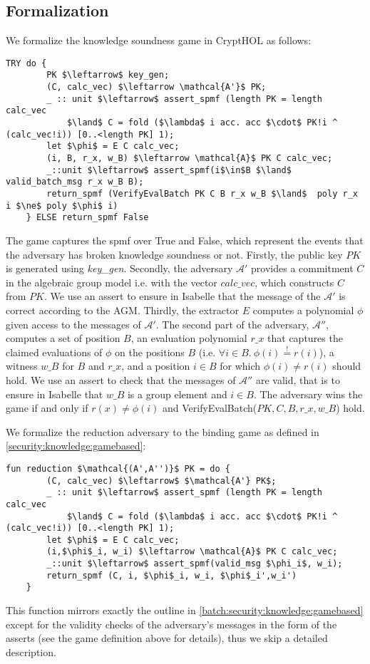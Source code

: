 \subsection{Formalization}
We formalize the knowledge soundness game in CryptHOL as follows: 
\begin{lstlisting}[language=isabelle]
    TRY do {
        PK $\leftarrow$ key_gen;
        (C, calc_vec) $\leftarrow \mathcal{A'}$ PK;
        _ :: unit $\leftarrow$ assert_spmf (length PK = length calc_vec 
            $\land$ C = fold ($\lambda$ i acc. acc $\cdot$ PK!i ^ (calc_vec!i)) [0..<length PK] 1);
        let $\phi$ = E C calc_vec;
        (i, B, r_x, w_B) $\leftarrow \mathcal{A}$ PK C calc_vec;
        _::unit $\leftarrow$ assert_spmf(i$\in$B $\land$ valid_batch_msg r_x w_B B);
        return_spmf (VerifyEvalBatch PK C B r_x w_B $\land$  poly r_x i $\ne$ poly $\phi$ i)
    } ELSE return_spmf False
\end{lstlisting}
The game captures the spmf over True and False, which represent the events that the adversary has broken knowledge soundness or not.
Firstly, the public key $PK$ is generated using \textit{key\_gen}. 
Secondly, the adversary $\mathcal{A'}$ provides a commitment $C$ in the algebraic group model i.e. with the vector $calc\_vec$, which constructs $C$ from $PK$. We use an assert to ensure in Isabelle that the message of the $\mathcal{A'}$ is correct according to the AGM.
Thirdly, the extractor $E$ computes a polynomial $\phi$ given access to the messages of $\mathcal{A'}$. 
The second part of the adversary, $\mathcal{A''}$, computes a set of position $B$, an evaluation polynomial $r\_x$ that captures the claimed evaluations of $\phi$ on the positions $B$ (i.e. $\forall i\in B.\ \phi(i)\stackrel{!}{=}r(i)$), a witness $w\_B$ for $B$ and $r\_x$, and a position $i\in B$ for which $\phi(i)\ne r(i)$ should hold. We use an assert to check that the messages of $\mathcal{A''}$ are valid, that is to ensure in Isabelle that $w\_B$ is a group element and $i\in B$.
The adversary wins the game if and only if $r(x) \ne \phi(i)$ and VerifyEvalBatch($PK,C,B, r\_x, w\_B$) hold.

We formalize the reduction adversary to the binding game as defined in \ref{security:knowledge:gamebased}: 
\begin{lstlisting}[language=isabelle]
    fun reduction $\mathcal{(A',A'')}$ PK = do {
        (C, calc_vec) $\leftarrow$ $\mathcal{A'} PK$;
        _ :: unit $\leftarrow$ assert_spmf (length PK = length calc_vec 
            $\land$ C = fold ($\lambda$ i acc. acc $\cdot$ PK!i ^ (calc_vec!i)) [0..<length PK] 1);
        let $\phi$ = E C calc_vec;
        (i,$\phi$_i, w_i) $\leftarrow \mathcal{A}$ PK C calc_vec;
        _::unit $\leftarrow$ assert_spmf(valid_msg $\phi_i$, w_i);
        return_spmf (C, i, $\phi$_i, w_i, $\phi$_i',w_i')
    }
\end{lstlisting}
This function mirrors exactly the outline in \ref{batch:security:knowledge:gamebased} except for the validity checks of the adversary's messages in the form of the asserts (see the game definition above for details), thus we skip a detailed description.
